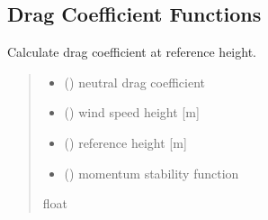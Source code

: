 \documentclass[letterpaper,10pt,english]{sphinxmanual}
\begin{document}
\subsection{Drag Coefficient Functions}
\label{\detokenize{users_guide:module-AirSeaFluxCode.flux_subs.drag_coef}}\label{\detokenize{users_guide:drag-coefficient-functions}}

\begin{fulllineitems}
\label{\detokenize{users_guide:AirSeaFluxCode.flux_subs.drag_coef.cd_calc}}
\pysigstartsignatures
{}
\pysigstopsignatures
\sphinxAtStartPar
Calculate drag coefficient at reference height.
\begin{quote}\begin{description}
\begin{itemize}
\item {} 
\sphinxAtStartPar
{} () \textendash{} neutral drag coefficient

\item {} 
\sphinxAtStartPar
{} () \textendash{} wind speed height       {[}m{]}

\item {} 
\sphinxAtStartPar
{} () \textendash{} reference height        {[}m{]}

\item {} 
\sphinxAtStartPar
{} () \textendash{} momentum stability function

\end{itemize}

\sphinxAtStartPar
{}

\sphinxAtStartPar
float

\end{description}\end{quote}

\end{fulllineitems}
\end{document}
